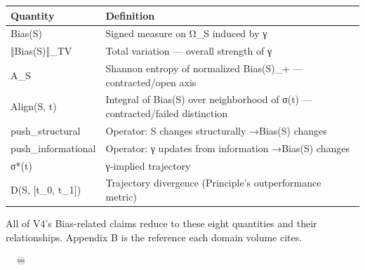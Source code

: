 \documentclass[11pt, openany]{book}
\newcommand{\sectionbreak}{\clearpage}
\begin{document}
\begingroup\setlength{\tabcolsep}{3pt}\renewcommand{\arraystretch}{1.15}\footnotesize
\begin{center}
\begin{tabular}{p{0.83in} p{3.56in}}
\toprule
Quantity & Definition \\
\midrule
Bias(S) & Signed measure on Ω\_\allowbreak{}S induced by γ \\
‖Bias(S)‖\_\allowbreak{}TV & Total variation --- overall strength of γ \\
A\_\allowbreak{}S & Shannon entropy of normalized Bias(S)\_\allowbreak{}+ --- contracted/\allowbreak open axis \\
Align(S, t) & Integral of Bias(S) over neighborhood of σ(t) --- contracted/\allowbreak failed distinction \\
push\_\allowbreak{}structural & Operator: S changes structurally →\allowbreak  Bias(S) changes \\
push\_\allowbreak{}informational & Operator: γ updates from information →\allowbreak  Bias(S) changes \\
σ*(t) & γ-implied trajectory \\
D(S, [t\_\allowbreak{}0, t\_\allowbreak{}1]) & Trajectory divergence (Principle's outperformance metric) \\
\bottomrule
\end{tabular}
\end{center}
\endgroup
All of V4's Bias-related claims reduce to these eight quantities and their relationships. Appendix B is the reference each domain volume cites.

\sectionbreak

🦞🧍💜🔥♾️
\end{document}
